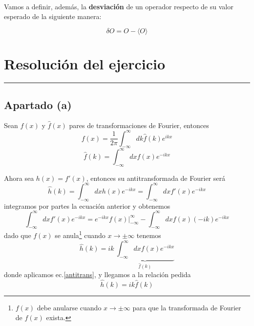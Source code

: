Vamos a definir, además, la \textbf{desviación} de un operador respecto de su valor esperado de la siguiente manera:

\begin{equation}\label{desvdef}
      \delta O = O - \langle O \rangle
\end{equation}
\newpage


\section{\huge{Resolución del ejercicio}}
\textcolor{myred}{\hrule}
\vspace{0.5cm}
\subsection{\textbf{Apartado (a)}}
Sean $f(x)$ y $\hat{f}(x)$ pares de transformaciones de Fourier, entonces
\begin{equation}
    f(x) = \frac{1}{2\pi}\int_{-\infty}^{\infty} dk \hat{f}(k) e^{ikx}
    \label{trans}
\end{equation}
\begin{equation}
    \hat{f}(k) = \int_{-\infty}^{\infty} dx f(x) e^{-ikx}
    \label{antitrans}
\end{equation}

Ahora sea $h(x)=f'(x)$, entonces su antitransformada de Fourier será
\begin{equation}
    \hat{h}(k) = \int_{-\infty}^{\infty} dx h(x) e^{-ikx} = \int_{-\infty}^{\infty} dx f'(x) e^{-ikx}
\end{equation}
integramos por partes la ecuación anterior y obtenemos 
\begin{equation}
        \int_{-\infty}^{\infty} dx f'(x) e^{-ikx} =  e^{-ikx} f(x) \biggr|_{-\infty}^{\infty} - \int_{-\infty}^{\infty} dx f(x) (-ik)e^{-ikx} 
\end{equation}
dado que $f(x)$ se anula\footnote{$f(x)$ debe anularse cuando $x \to \pm \infty$ para que la transformada de Fourier de $f(x)$ exista.} cuando $x \to \pm \infty$ tenemos
\begin{equation}
    \hat{h}(k) = ik ~\underbrace{\int_{-\infty}^{\infty} dx f(x) e^{-ikx}}_{ \hat{f}(k)}
\end{equation}
donde aplicamos ec.\ref{antitrans}, y llegamos a la relación pedida
\begin{equation}
    \hat{h}(k) = ik \hat{f}(k)
\end{equation}

